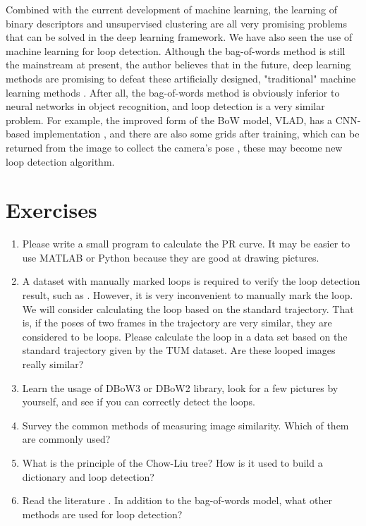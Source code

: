 Combined with the current development of machine learning, the learning of binary descriptors and unsupervised clustering are all very promising problems that can be solved in the deep learning framework. We have also seen the use of machine learning for loop detection. Although the bag-of-words method is still the mainstream at present, the author believes that in the future, deep learning methods are promising to defeat these artificially designed, "traditional" machine learning methods \cite{Gao2015b, Hou2015a, Cascianelli2017}. After all, the bag-of-words method is obviously inferior to neural networks in object recognition, and loop detection is a very similar problem. For example, the improved form of the BoW model, VLAD, has a CNN-based implementation \cite{Arandjelovic2016,AngelinaUy2018}, and there are also some grids after training, which can be returned from the image to collect the camera's pose \cite{Kendall2015}, these may become new loop detection algorithm.

\section*{Exercises}
\begin{enumerate}
	\item Please write a small program to calculate the PR curve. It may be easier to use MATLAB or Python because they are good at drawing pictures.
	\item A dataset with manually marked loops is required to verify the loop detection result, such as \cite{Cummins2008}. However, it is very inconvenient to manually mark the loop. We will consider calculating the loop based on the standard trajectory. That is, if the poses of two frames in the trajectory are very similar, they are considered to be loops. Please calculate the loop in a data set based on the standard trajectory given by the TUM dataset. Are these looped images really similar?
	\item Learn the usage of DBoW3 or DBoW2 library, look for a few pictures by yourself, and see if you can correctly detect the loops.
	\item Survey the common methods of measuring image similarity. Which of them are commonly used?
	\item What is the principle of the Chow-Liu tree? How is it used to build a dictionary and loop detection?
	\item Read the literature \cite{Williams2009}. In addition to the bag-of-words model, what other methods are used for loop detection?
\end{enumerate}
